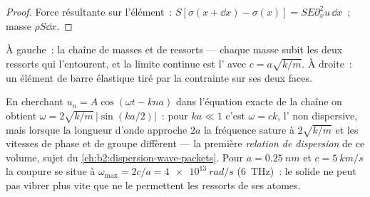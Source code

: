 \begin{proof}
Force résultante sur l'élément~: $S[\sigma(x + \dd x) - \sigma(x)] = SE\partial_x^2u\,\dd x$~;
masse $\rho S\dd x$.
\end{proof}

\begin{omfigure}

{\small À gauche~: la chaîne de masses et de ressorts --- chaque masse subit les
deux ressorts qui l'entourent, et la limite continue est l'
avec $c = a\sqrt{k/m}$. À droite~: un élément de barre élastique tiré par la
contrainte sur ses deux faces.}
\end{omfigure}

\begin{remark}\label{rem:b2:waves-on-strings:dispersion}
En cherchant $u_n = A\cos(\omega t - kna)$ dans l'équation exacte de la chaîne on obtient
$\omega = 2\sqrt{k/m}\,|\sin(ka/2)|$~: pour $ka \ll 1$ c'est $\omega = ck$, l' non dispersive, mais lorsque la longueur d'onde approche $2a$ la
fréquence sature à $2\sqrt{k/m}$ et les vitesses de phase et de groupe
diffèrent --- la première \emph{relation de dispersion} de ce volume, sujet du
\cref{ch:b2:dispersion-wave-packets}. Pour $a = \qty{0.25}{nm}$ et
$c = \qty{5}{km/s}$ la coupure se situe à $\omega_{\max} = 2c/a = \qty{4e13}{rad/s}$
(\qty{6}{THz})~: le solide ne peut pas vibrer plus vite que ne le permettent les ressorts
de ses atomes.
\end{remark}


